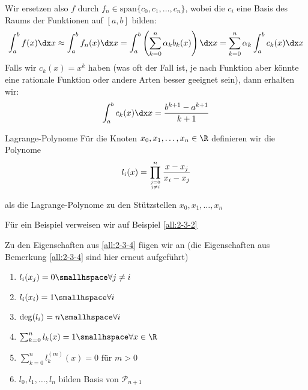 Wir ersetzen also $f$ durch $f_n \in \text{span} \{ c_0, c_1, \ldots, c_n \}$, wobei die $c_i$ eine Basis des Raums der Funktionen auf $[a, b]$ bilden:
\rmvspace
\begin{align*}
    \int_{a}^{b} f(x) \dx x \approx \int_{a}^{b} f_n(x) \dx x = \int_{a}^{b} \left( \sum_{k = 0}^{n} \alpha_k b_k(x) \right) \dx x = \sum_{k = 0}^{n} \alpha_k \int_{a}^{b} c_k(x) \dx x
\end{align*}
Falls wir $c_k(x) = x^k$ haben (was oft der Fall ist, je nach Funktion aber könnte eine rationale Funktion oder andere Arten besser geeignet sein), dann erhalten wir:
\rmvspace
\begin{align*}
    \int_{a}^{b} c_k(x) \dx x = \frac{b^{k + 1} - a^{k + 1}}{k + 1}
\end{align*}

\begin{definition}[]{Lagrange-Polynome}
    Für die Knoten $x_0, x_1, \ldots, x_n \in \R$ definieren wir die Polynome
    \rmvspace
    \begin{align*}
        l_i(x) = \prod_{j = 0 \atop j \neq i}^n \frac{x - x_j}{x_i - x_j}
    \end{align*}

    \rmvspace
    als die Lagrange-Polynome zu den Stützstellen $x_0, x_1, \ldots, x_n$
\end{definition}
Für ein Beispiel verweisen wir auf Beispiel \ref{all:2-3-2}

 Zu den Eigenschaften aus \ref{all:2-3-4} fügen wir an (die Eigenschaften aus Bemerkung \ref{all:2-3-4} sind hier erneut aufgeführt)
\begin{multicols}{2}
    \begin{enumerate}
        \item $l_i(x_j) = 0 \smallhspace \forall j \neq i$
        \item $l_i(x_i) = 1 \smallhspace \forall i$
        \item $\deg(l_i) = n \smallhspace \forall i$
        \item $\sum_{k = 0}^{n} l_k(x) = 1 \smallhspace \forall x \in \R$
        \item $\sum_{k = 0}^{n} l_k^{(m)}(x) = 0 \text{ für } m > 0$
        \item $l_0, l_1, \ldots, l_n$ bilden Basis von $\mathcal{P}_{n + 1}$
    \end{enumerate}
\end{multicols}

